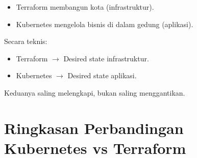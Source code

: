 \begin{itemize}
    \item Terraform membangun kota (infrastruktur).
    \item Kubernetes mengelola bisnis di dalam gedung (aplikasi).
\end{itemize}

Secara teknis:

\begin{itemize}
    \item Terraform $\rightarrow$ Desired state infrastruktur.
    \item Kubernetes $\rightarrow$ Desired state aplikasi.
\end{itemize}

Keduanya saling melengkapi, bukan saling menggantikan.


\section{Ringkasan Perbandingan Kubernetes vs Terraform}


